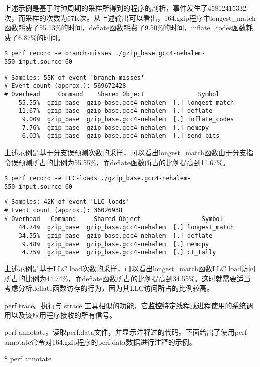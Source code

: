 \documentclass[]{ctexbook}
\begin{document}
上述示例是基于时钟周期的采样所得到的程序的剖析，事件发生了45812415332次，而采样的次数为57K次。从上述输出可以看出，164.gzip程序中longest\_match函数耗费了55.13\%的时间，deflate函数耗费了9.50\%的时间，inflate\_codes函数耗费了6.87\%的时间。

\texttt{\$\ perf\ record\ -e\ branch-misses\ ./gzip\_base.gcc4-nehalem-550\ input.source\ 60}

\begin{verbatim}
# Samples: 55K of event 'branch-misses'
# Event count (approx.): 569672428
# Overhead     Command    Shared Object               Symbol
    55.55%  gzip_base  gzip_base.gcc4-nehalem  [.] longest_match                    
    11.67%  gzip_base  gzip_base.gcc4-nehalem  [.] deflate                          
     9.00%  gzip_base  gzip_base.gcc4-nehalem  [.] inflate_codes                    
     7.76%  gzip_base  gzip_base.gcc4-nehalem  [.] memcpy                           
     6.03%  gzip_base  gzip_base.gcc4-nehalem  [.] send_bits                     
\end{verbatim}

上述示例是基于分支误预测次数的采样，可以看出longest\_match函数由于分支指令误预测所占的比例为55.55\%，而deflate函数所占的比例提高到11.67\%。

\texttt{\$\ perf\ record\ -e\ LLC-loads\ ./gzip\_base.gcc4-nehalem-550\ input.source\ 60}

\begin{verbatim}
# Samples: 42K of event 'LLC-loads'
# Event count (approx.): 36026938
# Overhead   Command     Shared Object                 Symbol
    44.74%  gzip_base  gzip_base.gcc4-nehalem  [.] longest_match              
    34.55%  gzip_base  gzip_base.gcc4-nehalem  [.] deflate                    
     9.48%  gzip_base  gzip_base.gcc4-nehalem  [.] memcpy                     
     4.75%  gzip_base  gzip_base.gcc4-nehalem  [.] ct_tally    
\end{verbatim}

上述示例是基于LLC load次数的采样，可以看出longest\_match函数LLC load访问所占的比例为44.74\%，而deflate函数所占的比例提高到34.55\%。这时就需要适当考虑分析deflate函数访存的行为，因为其LLC访问所占的比例较高。

perf trace。执行与 strace 工具相似的功能，它监控特定线程或进程使用的系统调用以及该应用程序接收的所有信号。

perf annotate。读取perf.data文件，并显示注释过的代码。下面给出了使用perf annotate命令对164.gzip程序的perf.data数据进行注释的示例。

\$ perf annotate
\end{document}

